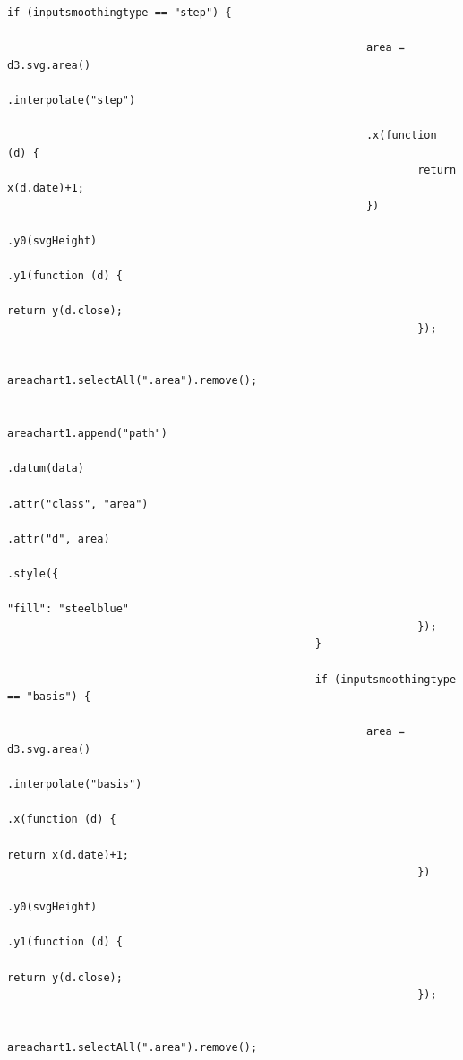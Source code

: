 \begin{lstlisting}[gobble=28]
                                                if (inputsmoothingtype == "step") {

                                                        area = d3.svg.area()
                                                                .interpolate("step")

                                                        .x(function (d) {
                                                                return x(d.date)+1;
                                                        })
                                                                .y0(svgHeight)
                                                                .y1(function (d) {
                                                                        return y(d.close);
                                                                });

                                                        areachart1.selectAll(".area").remove();

                                                        areachart1.append("path")
                                                                .datum(data)
                                                                .attr("class", "area")
                                                                .attr("d", area)
                                                                .style({
                                                                        "fill": "steelblue"
                                                                });
                                                }

                                                if (inputsmoothingtype == "basis") {

                                                        area = d3.svg.area()
                                                                .interpolate("basis")
                                                                .x(function (d) {
                                                                        return x(d.date)+1;
                                                                })
                                                                .y0(svgHeight)
                                                                .y1(function (d) {
                                                                        return y(d.close);
                                                                });

                                                        areachart1.selectAll(".area").remove();


\end{lstlisting}
